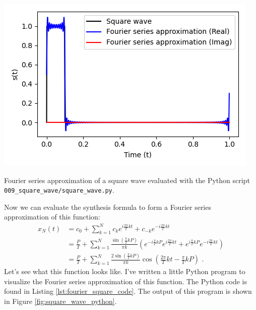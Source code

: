 \begin{marginfigure}
  \begin{center}
    \includegraphics[width=\textwidth]{code/009_square_wave/square_wave.png}
  \end{center}
  \caption{Fourier series approximation of a square wave evaluated with the Python script \texttt{009\_square\_wave/square\_wave.py}.}
  \label{fig:square_wave_python}
\end{marginfigure}

Now we can evaluate the synthesis formula to form a Fourier series approximation of this function:
\begin{align}
  x_N(t) & = c_0 + \sum_{k=1}^{N} c_k e^{i\frac{2\pi}{T}kt} + c_{-k} e^{-i\frac{2\pi}{T}kt}                                                                                                     \\
         & = \frac{P}{T} + \sum_{k=1}^{N} \frac{\sin\left(\frac{\pi}{T} kP\right)}{\pi k}  \left(e^{-i\frac{\pi}{T}kP}e^{i\frac{2\pi}{T}kt} + e^{i\frac{\pi}{T}kP}e^{-i\frac{2\pi}{T}kt}\right) \\
         & = \frac{P}{T} + \sum_{k=1}^{N} \frac{2\sin\left(\frac{\pi}{T} kP\right)}{\pi k} \cos\left( \frac{2\pi}{T}kt-\frac{\pi}{T}kP\right) \,\,.
\end{align}
Let's see what this function looks like. I've written a little Python
program to visualize the Fourier series approximation of this
function. The Python code is found in
Listing \ref{lst:fourier_square_code}. The output of this program is shown in Figure \ref{fig:square_wave_python}.



